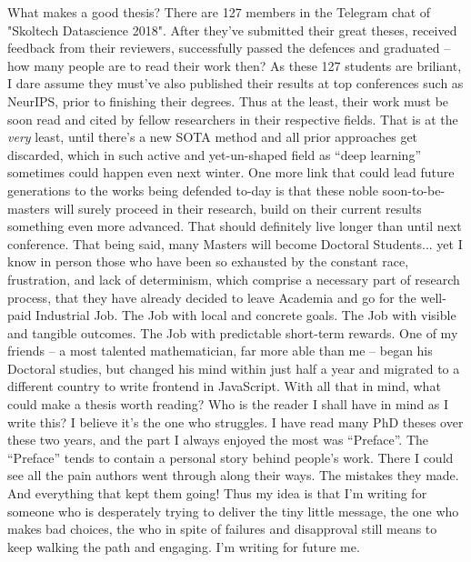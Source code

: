 What makes a good thesis? There are 127 members in the Telegram chat of
"Skoltech Datascience 2018". After they've submitted their great theses,
received feedback from their reviewers, successfully passed the defences and
graduated -- how many people are to read their work then? As these 127 students
are briliant, I dare assume they must've also published their results at top
conferences such as NeurIPS, prior to finishing their degrees. Thus at the
least, their work must be soon read and cited by fellow researchers in their
respective fields.  That is at the \emph{very} least, until there's a new SOTA
method and all prior approaches get discarded, which in such active and
yet-un-shaped field as ``deep learning'' sometimes could happen even next
winter. One more link that could lead future generations to the works being
defended to-day is that these noble soon-to-be-masters will surely proceed in
their research, build on their current results something even more advanced.
That should definitely live longer than until next conference.  That being
said, many Masters will become Doctoral Students... yet I know in person those
who have been so exhausted by the constant race, frustration, and lack of
determinism, which comprise a necessary part of research process, that they
have already decided to leave Academia and go for the well-paid Industrial Job.
The Job with local and concrete goals.  The Job with visible and tangible
outcomes. The Job with predictable short-term rewards. 
One of my friends -- a most talented mathematician, far more able than me
-- began his Doctoral studies, but changed his mind within just half a year and
migrated to a different country to write frontend in JavaScript.
With all that in mind, what could make a thesis worth reading? Who is the
reader I shall have in mind as I write this? I believe it's the one who
struggles. I have read many PhD theses over these two years, and the part I
always enjoyed the most was ``Preface''. The ``Preface'' tends to contain a
personal story behind people's work. There I could see all the pain authors
went through along their ways. The mistakes they made. And everything that kept
them going!  Thus my idea is that I'm writing for someone who is desperately
trying to deliver the tiny little message, the one who makes bad choices, the
who in spite of failures and disapproval still means to keep walking the path
and engaging. I'm writing for future me.


